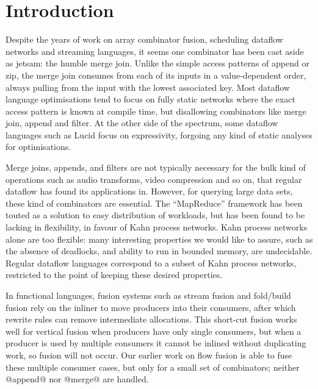 \section{Introduction}
\label{s:Introduction}

Despite the years of work on array combinator fusion, scheduling dataflow networks and streaming languages, it seems one combinator has been cast aside as jetsam: the humble merge join.
Unlike the simple access patterns of append or zip, the merge join consumes from each of its inputs in a value-dependent order, always pulling from the input with the lowest associated key.
Most dataflow language optimisations tend to focus on fully static networks where the exact access pattern is known at compile time\cite{thies2002streamit}, but disallowing combinators like merge join, append and filter.
At the other side of the spectrum, some dataflow languages such as Lucid\cite{stephens1997survey} focus on expressivity, forgoing any kind of static analyses for optimisations.

Merge joins, appends, and filters are not typically necessary for the bulk kind of operations such as audio transforms, video compression and so on, that regular dataflow has found its applications in\cite{johnston2004advances}.
However, for querying large data sets, these kind of combinators are essential.
The ``MapReduce'' framework has been touted as a solution to easy distribution of workloads, but has been found to be lacking in flexibility\cite{vrba2009kahn}, in favour of Kahn process networks.
Kahn process networks alone are too flexible: many interesting properties we would like to assure, such as the absence of deadlocks, and ability to run in bounded memory, are undecidable.
Regular dataflow languages correspond to a subset of Kahn process networks, restricted to the point of keeping these desired properties\cite{thies2009language}.

In functional languages, fusion systems such as stream fusion\cite{coutts2007stream} and fold/build fusion\cite{jones2001playing} rely on the inliner to move producers into their consumers, after which rewrite rules can remove intermediate allocations.
This short-cut fusion works well for vertical fusion when producers have only single consumers, but when a producer is used by multiple consumers it cannot be inlined without duplicating work, so fusion will not occur.
Our earlier work on flow fusion\cite{lippmeier2013data} is able to fuse these multiple consumer cases, but only for a small set of combinators; neither @append@ nor @merge@ are handled.

